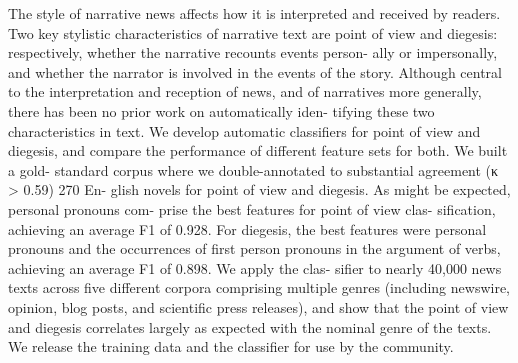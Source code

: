 The style of narrative news affects how it is interpreted and received by readers. Two key stylistic characteristics of narrative text are point of view and diegesis: respectively, whether the narrative recounts events person- ally or impersonally, and whether the narrator is involved in the events of the story. Although central to the interpretation and reception of news, and of narratives more generally, there has been no prior work on automatically iden- tifying these two characteristics in text. We develop automatic classifiers for point of view and diegesis, and compare the performance of different feature sets for both. We built a gold- standard corpus where we double-annotated to substantial agreement (κ > 0.59) 270 En- glish novels for point of view and diegesis. As might be expected, personal pronouns com- prise the best features for point of view clas- sification, achieving an average F1 of 0.928. For diegesis, the best features were personal pronouns and the occurrences of first person pronouns in the argument of verbs, achieving an average F1 of 0.898. We apply the clas- sifier to nearly 40,000 news texts across five different corpora comprising multiple genres (including newswire, opinion, blog posts, and scientific press releases), and show that the point of view and diegesis correlates largely as expected with the nominal genre of the texts. We release the training data and the classifier for use by the community.
